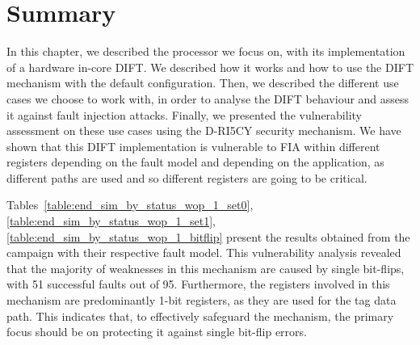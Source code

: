 \section{Summary}
In this chapter, we described the processor we focus on, with its implementation of a hardware in-core DIFT. We described how it works and how to use the DIFT mechanism with the default configuration. Then, we described the different use cases we choose to work with, in order to analyse the DIFT behaviour and assess it against fault injection attacks. Finally, we presented the vulnerability assessment on these use cases using the D-RI5CY security mechanism. We have shown that this DIFT implementation is vulnerable to FIA within different registers depending on the fault model and depending on the application, as different paths are used and so different registers are going to be critical.

Tables~\ref{table:end_sim_by_status_wop_1_set0}, \ref{table:end_sim_by_status_wop_1_set1}, \ref{table:end_sim_by_status_wop_1_bitflip} present the results obtained from the campaign with their respective fault model.
This vulnerability analysis revealed that the majority of weaknesses in this mechanism are caused by single bit-flips, with 51 successful faults out of 95. Furthermore, the registers involved in this mechanism are predominantly 1-bit registers, as they are used for the tag data path. This indicates that, to effectively safeguard the mechanism, the primary focus should be on protecting it against single bit-flip errors.

